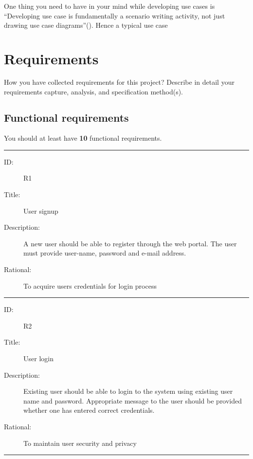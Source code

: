 One thing you need to have in your mind while developing use cases is ``Developing use case is fundamentally a scenario writing activity, not just drawing use case diagrams''(\cite{larman2012applying}). Hence a typical use case 

\section{Requirements} %
\label{sec:requirements}

How you have collected requirements for this project? Describe in detail your requirements capture, analysis, and specification method(s). 

\subsection{Functional requirements} %
\label{sub:functional_requirements}

You should at least have \textbf{10} functional requirements.

\hrule
\begin{description}
	\item[ID:] R1
	\item[Title:] User signup
	\item[Description:] A new user should be able to register through the web portal. The user must provide user-name, password and e-mail address.
	\item[Rational:] To acquire users credentials for login process
\end{description}
\hrule
\begin{description}
	\item[ID:] R2
	\item[Title:] User login
	\item[Description:] Existing user should be able to login to the system using existing user name and password. Appropriate message to the user should be provided whether one has entered correct credentials.
	\item[Rational:] To maintain user security and privacy
\end{description}
\hrule

